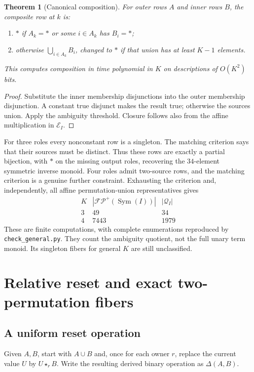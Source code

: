 \documentclass[11pt]{article}
\newtheorem{theorem}{Theorem}[section]
\newcommand{\Sym}{\operatorname{Sym}}
\newcommand{\FP}{\mathcal{FP}^{+}}
\begin{document}
\begin{theorem}[Canonical composition]\label{thm:composition}
For outer rows $A$ and inner rows $B$, the composite row at $k$ is:
\begin{enumerate}
\item $*$ if $A_k=*$ or some $i\in A_k$ has $B_i=*$;
\item otherwise $\bigcup_{i\in A_k}B_i$, changed to $*$ if that union
has at least $K-1$ elements.
\end{enumerate}
This computes composition in time polynomial in $K$ on descriptions of
$O(K^2)$ bits.
\end{theorem}
\begin{proof}
Substitute the inner membership disjunctions into the outer membership
disjunction. A constant true disjunct makes the result true; otherwise
the sources union. Apply the ambiguity threshold. Closure follows also
from the affine multiplication in $\mathcal E_I$.
\end{proof}

For three roles every nonconstant row is a singleton. The matching
criterion says that their sources must be distinct. Thus these rows
are exactly a partial bijection, with $*$ on the missing output roles,
recovering the $34$-element symmetric inverse monoid. Four roles admit
two-source rows, and the matching criterion is a genuine further
constraint. Exhausting the criterion and, independently, all affine
permutation-union representatives gives
\[
\begin{array}{c|rr}
K&|\FP(\Sym(I))|&|\mathcal Q_I|\\\hline
3&49&34\\
4&7443&1979
\end{array}
\]
These are finite computations, with complete enumerations reproduced by
\texttt{check\_general.py}. They count the ambiguity quotient, not the
full unary term monoid. Its singleton fibers for general $K$ are still
unclassified.

\section{Relative reset and exact two-permutation fibers}

\subsection{A uniform reset operation}

Given $A,B$, start with $A\cup B$ and, once for each owner $r$, replace
the current value $U$ by $U\star_r B$. Write the resulting derived
binary operation as $\Delta(A,B)$.
\end{document}
